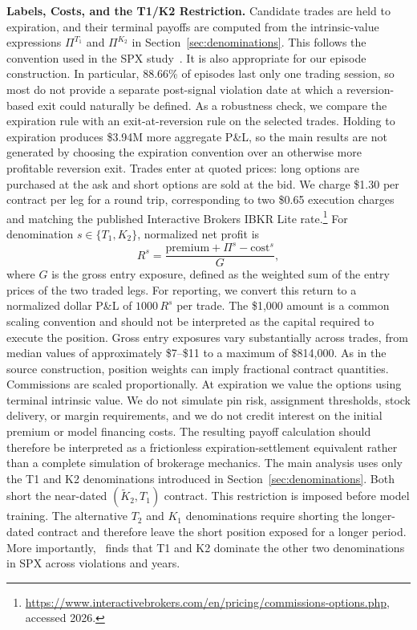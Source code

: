 \documentclass[sigconf,review,anonymous]{acmart}
\begin{document}
\smallskip\noindent\textbf{Labels, Costs, and the T1/K2 Restriction.}
\label{sec:labels}
Candidate trades are held to expiration, and their terminal payoffs are computed from the intrinsic-value expressions $\Pi^{T_1}$ and $\Pi^{K_2}$ in Section~\ref{sec:denominations}. This follows the convention used in the SPX study~\cite{glasserman2025tp2}. It is also appropriate for our episode construction. In particular, 88.66\% of episodes last only one trading session, so most do not provide a separate post-signal violation date at which a reversion-based exit could naturally be defined. As a robustness check, we compare the expiration rule with an exit-at-reversion rule on the selected trades. Holding to expiration produces \$3.94M more aggregate P\&L, so the main results are not generated by choosing the expiration convention over an otherwise more profitable reversion exit.
Trades enter at quoted prices: long options are purchased at the ask and short options are sold at the bid. We charge \$1.30 per contract per leg for a round trip, corresponding to two \$0.65 execution charges and matching the published Interactive Brokers IBKR Lite rate.\footnote{\url{https://www.interactivebrokers.com/en/pricing/commissions-options.php}, accessed 2026.} For denomination $s\in\{T_1,K_2\}$, normalized net profit is
\[
R^{s}=
\frac{\mathrm{premium}+\Pi^{s}-\mathrm{cost}^{s}}{G},
\]
where $G$ is the gross entry exposure, defined as the weighted sum of the entry prices of the two traded legs.
For reporting, we convert this return to a normalized dollar P\&L of $1000\,R^{s}$ per trade. The \$1{,}000 amount is a common scaling convention and should not be interpreted as the capital required to execute the position. Gross entry exposures vary substantially across trades, from median values of approximately \$7--\$11 to a maximum of \$814{,}000.
As in the source construction, position weights can imply fractional contract quantities. Commissions are scaled proportionally. At expiration we value the options using terminal intrinsic value. We do not simulate pin risk, assignment thresholds, stock delivery, or margin requirements, and we do not credit interest on the initial premium or model financing costs. The resulting payoff calculation should therefore be interpreted as a frictionless expiration-settlement equivalent rather than a complete simulation of brokerage mechanics.
The main analysis uses only the T1 and K2 denominations introduced in Section~\ref{sec:denominations}. Both short the near-dated $(\tilde K_2,T_1)$ contract. This restriction is imposed before model training. The alternative $T_2$ and $K_1$ denominations require shorting the longer-dated contract and therefore leave the short position exposed for a longer period. More importantly,~\cite{glasserman2025tp2} finds that T1 and K2 dominate the other two denominations in SPX across violations and years.
\end{document}
